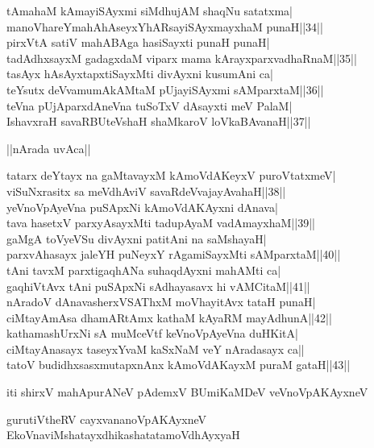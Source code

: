 \documentclass{article}
\begin{document}
tAmahaM kAmayiSAyxmi siMdhujAM shaqNu satatxma|\\
manoVhareYmahAhAseyxYhARsayiSAyxmayxhaM punaH||34||\\
pirxVtA satiV mahABAga hasiSayxti punaH punaH|\\
tadAdhxsayxM gadagxdaM viparx mama kArayxparxvadhaRnaM||35||\\
tasAyx hAsAyxtapxtiSayxMti divAyxni kusumAni ca|\\
teYsutx deVvamumAkAMtaM pUjayiSAyxmi sAMparxtaM||36||\\
teVna pUjAparxdAneVna tuSoTxV dAsayxti meV PalaM|\\
IshavxraH savaRBUteVshaH shaMkaroV loVkaBAvanaH||37||\\

\begin{center}
||nArada uvAca||
\end{center}

tatarx deYtayx na gaMtavayxM kAmoVdAKeyxV puroVtatxmeV|\\
viSuNxrasitx sa meVdhAviV savaRdeVvajayAvahaH||38||\\
yeVnoVpAyeVna puSApxNi kAmoVdAKAyxni dAnava|\\
tava hasetxV parxyAsayxMti tadupAyaM vadAmayxhaM||39||\\
gaMgA toVyeVSu divAyxni patitAni na saMshayaH|\\
parxvAhasayx jaleYH puNeyxY rAgamiSayxMti sAMparxtaM||40||\\
tAni tavxM parxtigaqhANa suhaqdAyxni mahAMti ca|\\
gaqhiVtAvx tAni puSApxNi sAdhayasavx hi vAMCitaM||41||\\
nAradoV dAnavasherxVSAThxM moVhayitAvx tataH punaH|\\
ciMtayAmAsa dhamARtAmx kathaM kAyaRM mayAdhunA||42||\\
kathamashUrxNi sA muMceVtf keVnoVpAyeVna duHKitA|\\
ciMtayAnasayx taseyxYvaM kaSxNaM veY nAradasayx ca||\\
tatoV budidhxsasxmutapxnAnx kAmoVdAKayxM puraM gataH||43||

\begin{center}
iti shirxV mahApurANeV pAdemxV BUmiKaMDeV veVnoVpAKAyxneV
\end{center}

\begin{center}
gurutiVtheRV cayxvananoVpAKAyxneV EkoVnaviMshatayxdhikashatatamoVdhAyxyaH
\end{center}
\end{document}
